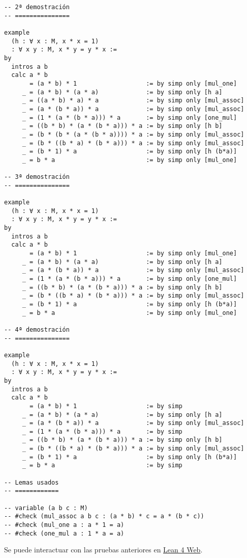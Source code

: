 \begin{verbatim}
-- 2ª demostración
-- ===============

example
  (h : ∀ x : M, x * x = 1)
  : ∀ x y : M, x * y = y * x :=
by
  intros a b
  calc a * b
       = (a * b) * 1                   := by simp only [mul_one]
     _ = (a * b) * (a * a)             := by simp only [h a]
     _ = ((a * b) * a) * a             := by simp only [mul_assoc]
     _ = (a * (b * a)) * a             := by simp only [mul_assoc]
     _ = (1 * (a * (b * a))) * a       := by simp only [one_mul]
     _ = ((b * b) * (a * (b * a))) * a := by simp only [h b]
     _ = (b * (b * (a * (b * a)))) * a := by simp only [mul_assoc]
     _ = (b * ((b * a) * (b * a))) * a := by simp only [mul_assoc]
     _ = (b * 1) * a                   := by simp only [h (b*a)]
     _ = b * a                         := by simp only [mul_one]

-- 3ª demostración
-- ===============

example
  (h : ∀ x : M, x * x = 1)
  : ∀ x y : M, x * y = y * x :=
by
  intros a b
  calc a * b
       = (a * b) * 1                   := by simp only [mul_one]
     _ = (a * b) * (a * a)             := by simp only [h a]
     _ = (a * (b * a)) * a             := by simp only [mul_assoc]
     _ = (1 * (a * (b * a))) * a       := by simp only [one_mul]
     _ = ((b * b) * (a * (b * a))) * a := by simp only [h b]
     _ = (b * ((b * a) * (b * a))) * a := by simp only [mul_assoc]
     _ = (b * 1) * a                   := by simp only [h (b*a)]
     _ = b * a                         := by simp only [mul_one]

-- 4ª demostración
-- ===============

example
  (h : ∀ x : M, x * x = 1)
  : ∀ x y : M, x * y = y * x :=
by
  intros a b
  calc a * b
       = (a * b) * 1                   := by simp
     _ = (a * b) * (a * a)             := by simp only [h a]
     _ = (a * (b * a)) * a             := by simp only [mul_assoc]
     _ = (1 * (a * (b * a))) * a       := by simp
     _ = ((b * b) * (a * (b * a))) * a := by simp only [h b]
     _ = (b * ((b * a) * (b * a))) * a := by simp only [mul_assoc]
     _ = (b * 1) * a                   := by simp only [h (b*a)]
     _ = b * a                         := by simp

-- Lemas usados
-- ============

-- variable (a b c : M)
-- #check (mul_assoc a b c : (a * b) * c = a * (b * c))
-- #check (mul_one a : a * 1 = a)
-- #check (one_mul a : 1 * a = a)
\end{verbatim}
Se puede interactuar con las pruebas anteriores en \href{https://lean.math.hhu.de/\#url=https://raw.githubusercontent.com/jaalonso/Calculemus2/main/src/Los\_monoides\_booleanos\_son\_conmutativos.lean}{Lean 4 Web}.

